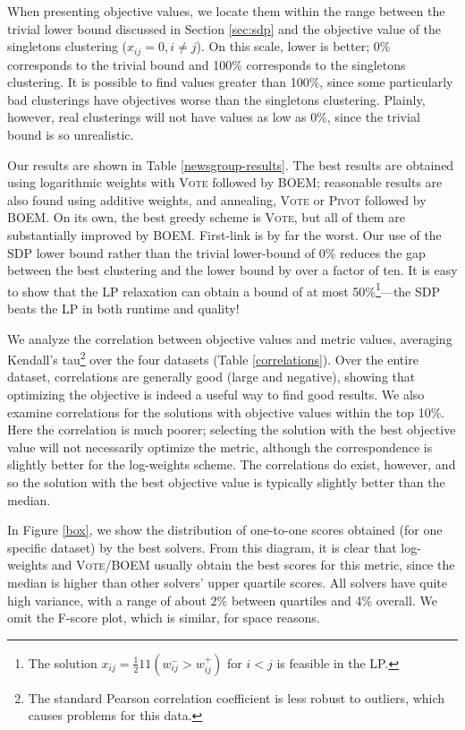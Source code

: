 \documentclass[11pt]{article}
\newcommand{\one}[1]{1\!\!1\left(#1\right)}
\newcommand{\alg}[1]{\textsc{#1}}
\begin{document}
When presenting objective values, we locate them within the range
between the trivial lower bound discussed in Section \ref{sec:sdp} and the
objective value of the singletons clustering ($x_{ij} = 0, i \ne
j$). On this scale, lower is better; 0\% corresponds to the trivial
bound and 100\% corresponds to the singletons clustering. It is
possible to find values greater than 100\%, since some particularly
bad clusterings have objectives worse than the singletons
clustering. Plainly, however, real clusterings will not have values as
low as 0\%, since the trivial bound is so unrealistic.

Our results are shown in Table \ref{newsgroup-results}. The best
results are obtained using logarithmic weights with \alg{Vote}
followed by \alg{BOEM}; reasonable results are also found using
additive weights, and annealing, \alg{Vote} or \alg{Pivot} followed by
\alg{BOEM}. On its own, the best greedy scheme is \alg{Vote}, but all
of them are substantially improved by \alg{BOEM}. First-link is by far
the worst. Our use of the SDP lower bound rather than the trivial
lower-bound of 0\% reduces the gap between the best clustering and the
lower bound by over a factor of ten. It is easy to show that the LP
relaxation can obtain a bound of at most 50\%\footnote{The solution
  $x_{ij} = \frac{1}{2} \one{w^-_{ij} > w^+_{ij}}$ for $i < j$ is
  feasible in the LP.}---the SDP beats the LP in both runtime and
quality!

We analyze the correlation between objective values and metric values,
averaging Kendall's tau\footnote{The standard Pearson correlation
  coefficient is less robust to outliers, which causes problems for
  this data.} over the four datasets (Table \ref{correlations}). Over
the entire dataset, correlations are generally good (large and
negative), showing that optimizing the objective is indeed a useful
way to find good results. We also examine correlations for the
solutions with objective values within the top 10\%. Here the
correlation is much poorer; selecting the solution with the best
objective value will not necessarily optimize the metric, although the
correspondence is slightly better for the log-weights scheme. The
correlations do exist, however, and so the solution with the best
objective value is typically slightly better than the median.

In Figure \ref{box}, we show the distribution of one-to-one scores
obtained (for one specific dataset) by the best solvers. From this
diagram, it is clear that log-weights and \alg{Vote}/\alg{BOEM} usually obtain the
best scores for this metric, since the median is higher than other
solvers' upper quartile scores. All solvers have quite high variance,
with a range of about 2\% between quartiles and 4\% overall. We omit
the F-score plot, which is similar, for space reasons.
\end{document}
